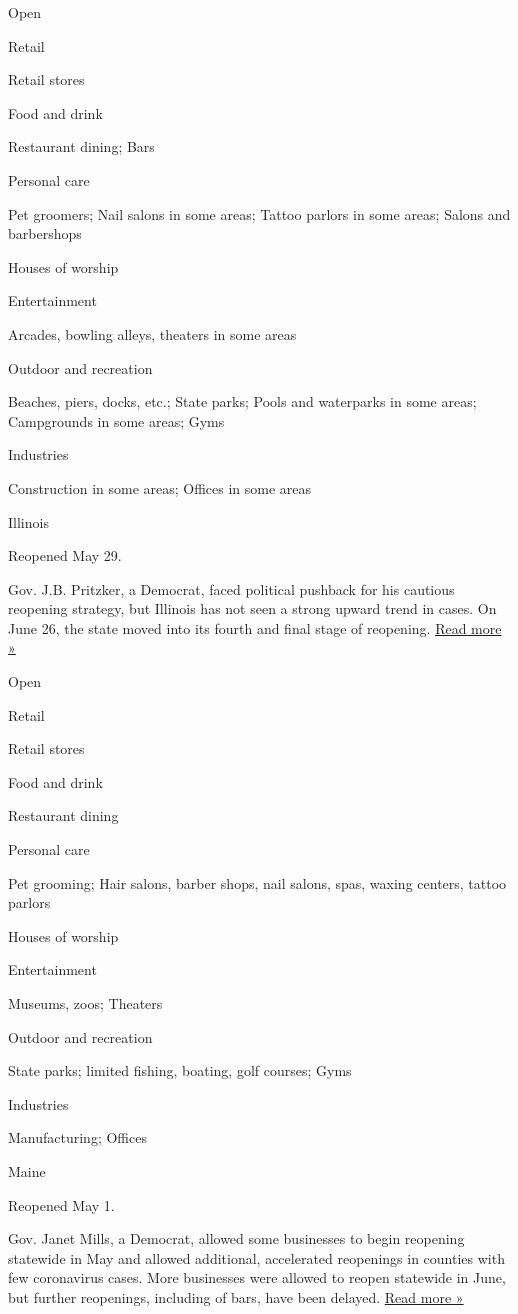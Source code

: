 Open

Retail

Retail stores

Food and drink

Restaurant dining; Bars

Personal care

Pet groomers; Nail salons in some areas; Tattoo parlors in some areas;
Salons and barbershops

Houses of worship

Entertainment

Arcades, bowling alleys, theaters in some areas

Outdoor and recreation

Beaches, piers, docks, etc.; State parks; Pools and waterparks in some
areas; Campgrounds in some areas; Gyms

Industries

Construction in some areas; Offices in some areas

Illinois

Reopened May 29.

Gov. J.B. Pritzker, a Democrat, faced political pushback for his
cautious reopening strategy, but Illinois has not seen a strong upward
trend in cases. On June 26, the state moved into its fourth and final
stage of reopening.
\href{https://www.wbez.org/stories/use-this-tool-to-track-illinois-reopening-plan-by-phase-region-and-address/51871836-6a73-47dc-a8f1-18c6fe2f2a6e}{Read
more »}

Open

Retail

Retail stores

Food and drink

Restaurant dining

Personal care

Pet grooming; Hair salons, barber shops, nail salons, spas, waxing
centers, tattoo parlors

Houses of worship

Entertainment

Museums, zoos; Theaters

Outdoor and recreation

State parks; limited fishing, boating, golf courses; Gyms

Industries

Manufacturing; Offices

Maine

Reopened May 1.

Gov. Janet Mills, a Democrat, allowed some businesses to begin reopening
statewide in May and allowed additional, accelerated reopenings in
counties with few coronavirus cases. More businesses were allowed to
reopen statewide in June, but further reopenings, including of bars,
have been delayed.
\href{https://bangordailynews.com/2020/06/22/business/janet-mills-postpones-reopening-indoor-bar-service-citing-infections-in-other-states/}{Read
more »}

